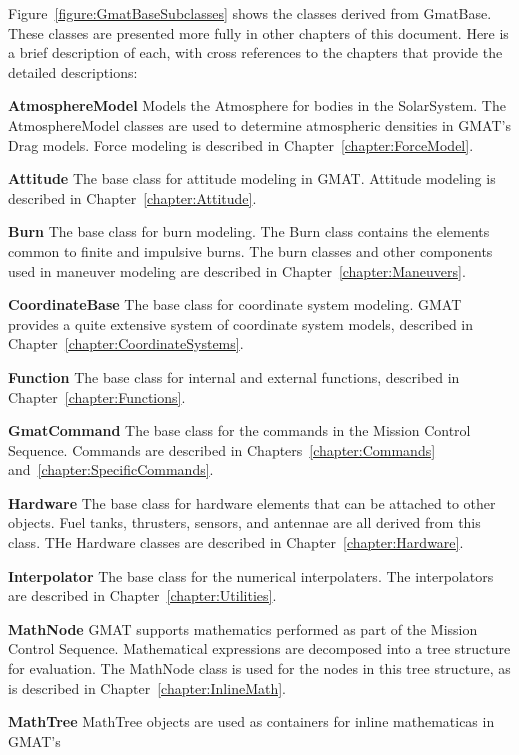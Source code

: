 Figure~\ref{figure:GmatBaseSubclasses} shows the classes derived from GmatBase.  These classes are
presented more fully in other chapters of this document.  Here is a brief description of each, with
cross references to the chapters that provide the detailed descriptions:

\begin{description}
\item \textbf{AtmosphereModel} Models the Atmosphere for bodies in the SolarSystem.  The
AtmosphereModel classes are used to determine atmospheric densities in GMAT's Drag models.  Force
modeling is described in Chapter~\ref{chapter:ForceModel}.
\item \textbf{Attitude} The base class for attitude modeling in GMAT.  Attitude modeling is
described in Chapter~\ref{chapter:Attitude}.
\item \textbf{Burn} The base class for burn modeling.  The Burn class contains the elements common
to finite and impulsive burns.  The burn classes and other components used in maneuver modeling are
described in Chapter~\ref{chapter:Maneuvers}.
\item \textbf{CoordinateBase} The base class for coordinate system modeling.  GMAT provides a quite
extensive system of coordinate system models, described in Chapter~\ref{chapter:CoordinateSystems}.
\item \textbf{Function} The base class for internal and external functions, described in
Chapter~\ref{chapter:Functions}.
\item \textbf{GmatCommand} The base class for the commands in the Mission Control Sequence. 
Commands are described in Chapters~\ref{chapter:Commands} and~\ref{chapter:SpecificCommands}.
\item \textbf{Hardware} The base class for hardware elements that can be attached to other objects. 
Fuel tanks, thrusters, sensors, and antennae are all derived from this class.  THe Hardware classes
are described in Chapter~\ref{chapter:Hardware}.
\item \textbf{Interpolator} The base class for the numerical interpolaters.  The interpolators are
described in Chapter~\ref{chapter:Utilities}.
\item \textbf{MathNode} GMAT supports mathematics performed as part of the Mission Control
Sequence. Mathematical expressions are decomposed into a tree structure for evaluation.  The
MathNode class is used for the nodes in this tree structure, as is described in
Chapter~\ref{chapter:InlineMath}.
\item \textbf{MathTree} MathTree objects are used as containers for inline mathematicas in GMAT's

\end{description}
